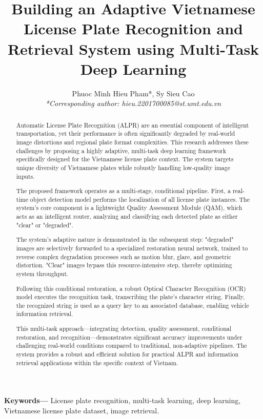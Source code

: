 \documentclass[a4paper,11pt]{article}
\title{\vspace{-2em}\bfseries
	Building an Adaptive Vietnamese License Plate Recognition and Retrieval System using Multi-Task Deep Learning
}
\author{
	Phuoc Minh Hieu Pham*, Sy Sieu Cao\\
	\small \textit{*Corresponding author: hieu.2201700085@st.umt.edu.vn}
}
\date{}
\begin{document}
\maketitle

\begin{abstract}
	Automatic License Plate Recognition (ALPR) are an essential component of intelligent transportation, yet their performance is often significantly degraded by real-world image distortions and regional plate format complexities. This research addresses these challenges by proposing a highly adaptive, multi-task deep learning framework specifically designed for the Vietnamese license plate context. The system targets unique diversity of Vietnamese plates while robustly handling low-quality image inputs.
	
	The proposed framework operates as a multi-stage, conditional pipeline.	First, a real-time object detection model performs the localization of all license plate instances. The system's core component is a lightweight Quality Assessment Module (QAM), which acts as an intelligent router, analyzing and classifying each detected plate as either "clear" or "degraded".
	
	The system's adaptive nature is demonstrated in the subsequent step: "degraded" images are selectively forwarded to a specialized restoration neural network, trained to reverse complex degradation processes such as motion blur, glare, and geometric distortion. "Clear" images bypass this resource-intensive step, thereby optimizing system throughput.
	
	Following this conditional restoration, a robust Optical Character Recognition (OCR) model executes the recognition task, transcribing the plate's character string. Finally, the recognized string is used as a query key to an associated database, enabling vehicle information retrieval.
	
	This multi-task approach—integrating detection, quality assessment, conditional restoration, and recognition—demonstrates significant accuracy improvements under challenging real-world conditions compared to traditional, non-adaptive pipelines. The system provides a robust and efficient solution for practical ALPR and information retrieval applications within the specific context of Vietnam.

\end{abstract}

\vspace{0.5em}

\textbf{\small Keywords—}
License plate recognition, multi-task learning, deep learning, Vietnamese license plate dataset, image retrieval.
\end{document}
